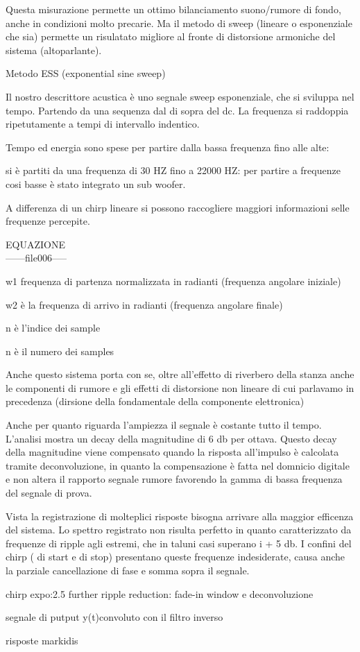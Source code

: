 Questa misurazione permette un ottimo bilanciamento suono/rumore di fondo,
anche in condizioni molto precarie.
Ma il metodo  di sweep (lineare o esponenziale che sia) permette un risulatato
migliore al fronte di distorsione armoniche del sistema (altoparlante).

Metodo ESS (exponential sine sweep)

Il nostro descrittore acustica è uno segnale sweep esponenziale, che si sviluppa nel tempo.
Partendo da una sequenza dal di sopra del dc. 
La frequenza si raddoppia ripetutamente a tempi di intervallo indentico.

Tempo ed energia sono spese per partire dalla bassa frequenza fino alle alte:

si è partiti da una frequenza di 30 HZ fino a 22000 HZ:
per partire a frequenze cosi basse è stato integrato un sub woofer.

A differenza di un chirp lineare si possono raccogliere maggiori informazioni selle frequenze percepite. 

EQUAZIONE \\
------file006-----

w1 frequenza di partenza normalizzata in radianti (frequenza angolare iniziale)

w2 è la frequenza di arrivo in radianti (frequenza angolare finale)

n è l'indice dei sample

n è il numero dei samples

Anche questo sistema porta con se, oltre all'effetto di riverbero della stanza anche
le componenti di rumore e gli effetti di distorsione non lineare di cui parlavamo in
precedenza (dirsione della fondamentale della componente elettronica)

Anche per quanto riguarda l'ampiezza il segnale è costante tutto il tempo. L'analisi
mostra un decay della magnitudine di 6 db per ottava. Questo decay della magnitudine
viene compensato quando la risposta all'impulso è calcolata tramite deconvoluzione,
in quanto la compensazione è fatta nel domnicio digitale e non altera il rapporto
segnale rumore favorendo la gamma di bassa frequenza del segnale di prova.

Vista la registrazione di molteplici risposte bisogna arrivare alla maggior efficenza
del sistema.
 Lo spettro registrato non risulta perfetto in quanto caratterizzato da frequenze di
 ripple agli estremi, che in taluni casi superano i + 5 db. I confini del chirp ( di start e di stop)
 presentano queste frequenze indesiderate, causa anche la parziale cancellazione di fase e somma sopra il segnale. 


chirp expo:2.5 further ripple reduction: fade-in window  e deconvoluzione

segnale di putput y(t)convoluto con il filtro inverso

risposte markidis

\clearpage

~

\clearpage

